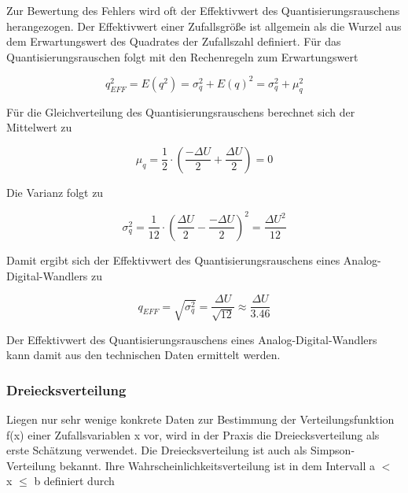 \noindent Zur Bewertung des Fehlers wird oft der Effektivwert des Quantisierungsrauschens herangezogen. Der Effektivwert einer Zufallsgr\"{o}{\ss}e ist allgemein als die Wurzel aus dem Erwartungswert des Quadrates der Zufallszahl definiert. F\"{u}r das Quantisierungsrauschen folgt mit den Rechenregeln zum Erwartungswert

\begin{equation}\label{eq:fourhundredseventyone}
q_{EFF}^{2} =E\left(q^{2} \right)=\sigma _{q}^{2} +E\left(q\right)^{2} =\sigma _{q}^{2} +\mu _{q}^{2}
\end{equation}

\noindent F\"{u}r die Gleichverteilung des Quantisierungsrauschens berechnet sich der Mittelwert zu

\begin{equation}\label{eq:fourhundredseventytwo}
\mu _{q} =\dfrac{1}{2} \cdot \left(\dfrac{-\Delta U}{2} +\dfrac{\Delta U}{2} \right)=0
\end{equation}

\noindent Die Varianz folgt zu

\begin{equation}\label{eq:fourhundredseventythree}
\sigma _{q}^{2} =\dfrac{1}{12} \cdot \left(\dfrac{\Delta U}{2} -\dfrac{-\Delta U}{2} \right)^{2} =\dfrac{\Delta U^{2} }{12}
\end{equation}

\noindent Damit ergibt sich der Effektivwert des Quantisierungsrauschens eines Analog-Digital-Wandlers zu

\begin{equation}\label{eq:fourhundredseventyfour}
q_{EFF} =\sqrt{\sigma _{q}^{2} } =\dfrac{\Delta U}{\sqrt{12} } \approx \dfrac{\Delta U}{3.46}
\end{equation}

\noindent Der Effektivwert des Quantisierungsrauschens eines Analog-Digital-Wandlers kann damit aus den technischen Daten ermittelt werden.

\subsubsection{Dreiecksverteilung}

\noindent Liegen nur sehr wenige konkrete Daten zur Bestimmung der Verteilungsfunktion f(x) einer Zufallsvariablen x vor, wird in der Praxis die Dreiecksverteilung als erste Sch\"{a}tzung verwendet. Die Dreiecksverteilung ist auch als Simpson-Verteilung bekannt. Ihre Wahrscheinlichkeitsverteilung ist in dem Intervall a $\mathrm{<}$ x $\leq$ b definiert durch

